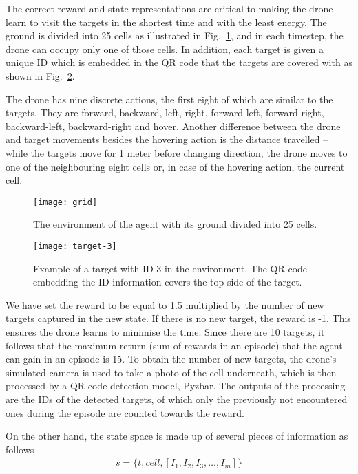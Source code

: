 \documentclass[../main.tex]{subfiles}
\begin{document}
The correct reward and state representations are critical
to making the drone learn to visit the targets in the shortest
time and with the least energy.
The ground is divided into 25 cells as illustrated in 
Fig.~\ref{fig:grid}, and in each timestep,
the drone can occupy only one of those cells.
In addition, each target is given a unique ID which 
is embedded in the QR code that the targets are covered with
as shown in Fig.~\ref{fig:target}.

The drone has nine discrete actions, the first eight of which
are similar to the targets.
They are forward, backward, left, right,
forward-left, forward-right, backward-left, backward-right
and hover. 
Another difference between the drone and target movements 
besides the hovering action  
is the distance travelled -- while the targets move for 
1 meter before changing direction, the drone moves to 
one of the neighbouring eight cells or,
in case of the hovering action, the current cell.

\begin{figure}[!t]
	\centering
	\texttt{[image: grid]}
	\caption{The environment of the agent with its ground
		divided into 25 cells.}
	\label{fig:grid}
\end{figure}

\begin{figure}[!t]
	\centering
	\texttt{[image: target-3]}
	\caption{Example of a target with ID 3 in the environment. The QR code
		embedding the ID information covers the top side of the target.}
	\label{fig:target}
\end{figure}

We have set the reward to be equal to 1.5 multiplied by 
the number of new targets captured in the new state.
If there is no new target, the reward is -1. 
This ensures the drone learns to
minimise the time.
Since there are 10 targets, it follows that the maximum
return (sum of rewards in an episode) that the agent can gain  
in an episode is 15.
To obtain the number of new targets, the drone's simulated camera is
used to take a photo of the cell
underneath, which is then processed by a QR code detection 
model, Pyzbar. 
The outputs of the processing are the IDs of 
the detected targets, 
of which only the previously not encountered ones during 
the episode are counted towards the reward.

On the other hand, the state space is made up of several 
pieces of information as follows
\begin{align}
	s = \{ t, cell, [ I_1, I_2, I_3, \ldots, I_m] \} 
	\label{eq:state-space}
\end{align}
\end{document}

